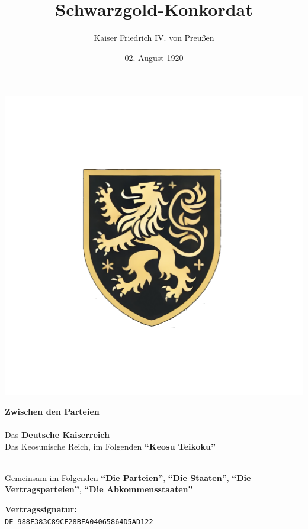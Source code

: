 \documentclass{article}
\title{Schwarzgold-Konkordat}
\author{Kaiser Friedrich IV. von Preußen}
\date{02. August 1920}
\begin{document}
\maketitle
\begin{center}
    \includegraphics[scale=.22]{coa_blackgold_concordat.png}
\end{center}
\begin{center}
    \textbf{Zwischen den Parteien\\}\textbf{\\}
    Das \textbf{Deutsche Kaiserreich\\}
    Das Keosunische Reich, im Folgenden \textbf{``Keosu Teikoku''}\\
    \textbf{\\}

    Gemeinsam im Folgenden \textbf{``Die Parteien''}, \textbf{``Die Staaten''}, \textbf{``Die Vertragsparteien''}, \textbf{``Die Abkommensstaaten''}
\end{center}
\newpage
{}
\vspace*{\fill}
\begin{Center}
\textbf{Vertragssignatur:\\}
\texttt{DE-988F383C89CF28BFA04065864D5AD122}
\vspace*{\fill}
\end{Center}
\newpage
\tableofcontents
\newpage
\end{document}
